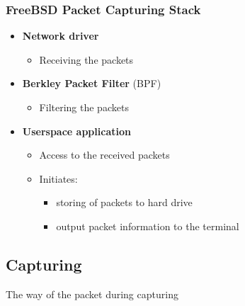 \documentclass{beamer}
\begin{document}
\begin{frame}
\frametitle{FreeBSD Packet Capturing Stack}
\begin{itemize}
	\item \textbf{Network driver}
		\begin{itemize}
			\item Receiving the packets\newline
		\end{itemize}
	\item \textbf{Berkley Packet Filter} (BPF)
		\begin{itemize}
			\item Filtering the packets\newline
		\end{itemize}
	\item \textbf{Userspace application}
		\begin{itemize}
			\item Access to the received packets
			\item Initiates:
				\begin{itemize}
					\item storing of packets to hard drive
					\item output packet information to the terminal
				\end{itemize}
		\end{itemize}
\end{itemize}
\end{frame}

\subsection*{Capturing}
\begin{frame}
	\begin{center}
	\huge{The way of the packet during capturing}
	\end{center}
\end{frame}
\end{document}
